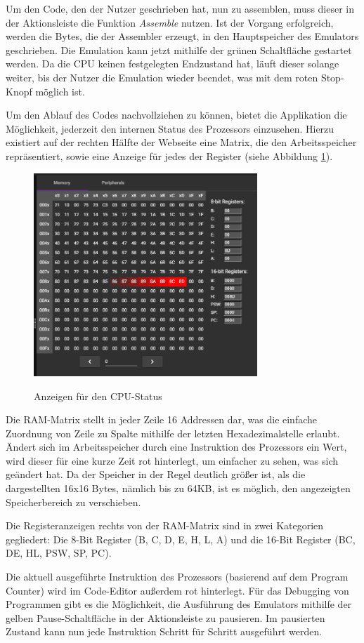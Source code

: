Um den Code, den der Nutzer geschrieben hat, nun zu assemblen, muss dieser in der Aktionsleiste die Funktion \textit{Assemble} nutzen. Ist der Vorgang erfolgreich, werden die Bytes, die der Assembler erzeugt, in den Hauptspeicher des Emulators geschrieben. Die Emulation kann jetzt mithilfe der grünen Schaltfläche gestartet werden. Da die CPU keinen festgelegten Endzustand hat, läuft dieser solange weiter, bis der Nutzer die Emulation wieder beendet, was mit dem roten Stop-Knopf möglich ist.

Um den Ablauf des Codes nachvollziehen zu können, bietet die Applikation die Möglichkeit, jederzeit den internen Status des Prozessors einzusehen. Hierzu existiert auf der rechten Hälfte der Webseite eine Matrix, die den Arbeitsspeicher repräsentiert, sowie eine Anzeige für jedes der Register (siehe Abbildung \ref{fig:cpustate}).

\begin{figure}
    \caption{Anzeigen für den CPU-Status}
    \centering
    \includegraphics[width=0.75\textwidth]{Bilder/CPUState.png}
    \label{fig:cpustate}
\end{figure}

Die \ac{RAM}-Matrix stellt in jeder Zeile 16 Addressen dar, was die einfache Zuordnung von Zeile zu Spalte mithilfe der letzten Hexadezimalstelle erlaubt. Ändert sich im Arbeitsspeicher durch eine Instruktion des Prozessors ein Wert, wird dieser für eine kurze Zeit rot hinterlegt, um einfacher zu sehen, was sich geändert hat. Da der Speicher in der Regel deutlich größer ist, als die dargestellten 16x16 Bytes, nämlich bis zu 64KB, ist es möglich, den angezeigten Speicherbereich zu verschieben.

Die Registeranzeigen rechts von der \ac{RAM}-Matrix sind in zwei Kategorien gegliedert: Die 8-Bit Register (B, C, D, E, H, L, A) und die 16-Bit Register (BC, DE, HL, PSW, SP, PC).

Die aktuell ausgeführte Instruktion des Prozessors (basierend auf dem Program Counter) wird im Code-Editor außerdem rot hinterlegt. Für das Debugging von Programmen gibt es die Möglichkeit, die Ausführung des Emulators mithilfe der gelben Pause-Schaltfläche in der Aktionsleiste zu pausieren. Im pausierten Zustand kann nun jede Instruktion Schritt für Schritt ausgeführt werden.